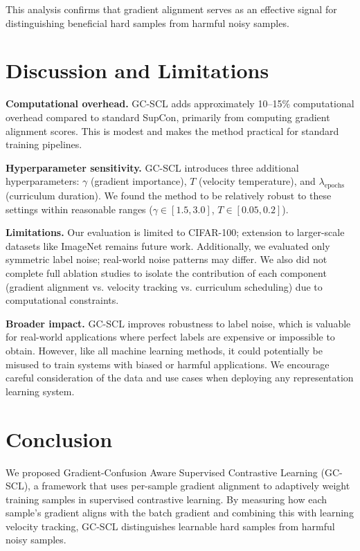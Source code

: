 \documentclass{article}
\begin{document}
This analysis confirms that gradient alignment serves as an effective signal for distinguishing beneficial hard samples from harmful noisy samples.

\section{Discussion and Limitations}

\textbf{Computational overhead.} GC-SCL adds approximately 10--15\% computational overhead compared to standard SupCon, primarily from computing gradient alignment scores. This is modest and makes the method practical for standard training pipelines.

\textbf{Hyperparameter sensitivity.} GC-SCL introduces three additional hyperparameters: $\gamma$ (gradient importance), $T$ (velocity temperature), and $\lambda_{\text{epochs}}$ (curriculum duration). We found the method to be relatively robust to these settings within reasonable ranges ($\gamma \in [1.5, 3.0]$, $T \in [0.05, 0.2]$).

\textbf{Limitations.} Our evaluation is limited to CIFAR-100; extension to larger-scale datasets like ImageNet remains future work. Additionally, we evaluated only symmetric label noise; real-world noise patterns may differ. We also did not complete full ablation studies to isolate the contribution of each component (gradient alignment vs. velocity tracking vs. curriculum scheduling) due to computational constraints.

\textbf{Broader impact.} GC-SCL improves robustness to label noise, which is valuable for real-world applications where perfect labels are expensive or impossible to obtain. However, like all machine learning methods, it could potentially be misused to train systems with biased or harmful applications. We encourage careful consideration of the data and use cases when deploying any representation learning system.

\section{Conclusion}

We proposed Gradient-Confusion Aware Supervised Contrastive Learning (GC-SCL), a framework that uses per-sample gradient alignment to adaptively weight training samples in supervised contrastive learning. By measuring how each sample's gradient aligns with the batch gradient and combining this with learning velocity tracking, GC-SCL distinguishes learnable hard samples from harmful noisy samples.
\end{document}
